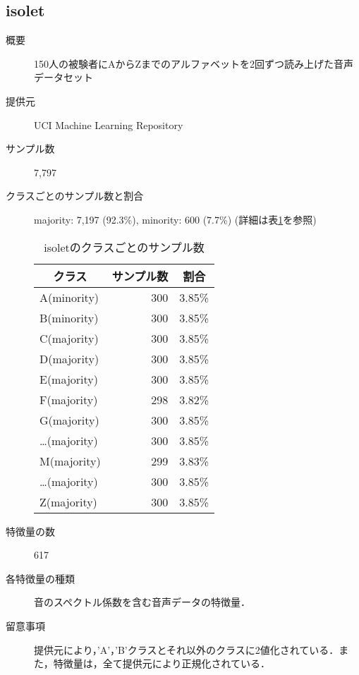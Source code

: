 \subsection{isolet}
\begin{description}
    \item[概要] 150人の被験者にAからZまでのアルファベットを2回ずつ読み上げた音声データセット\cite{isolet}
    \item[提供元] UCI Machine Learning Repository
    \item[サンプル数] 7,797
    \item[クラスごとのサンプル数と割合] majority: 7,197 (92.3\%), minority: 600 (7.7\%) (詳細は表\ref{tab:isolet}を参照)

        \begin{table}[htbp]
            \centering
            \caption{isoletのクラスごとのサンプル数}
            \label{tab:isolet}
            \begin{tabular}{lrc} \hline
                \multicolumn{1}{c}{クラス}&
                \multicolumn{1}{c}{サンプル数}&
                \multicolumn{1}{c}{割合}\\
                \hline
                \hline
                A(minority)&300&3.85\%\\
                B(minority)&300&3.85\%\\
                C(majority)&300&3.85\%\\
                D(majority)&300&3.85\%\\
                E(majority)&300&3.85\%\\
                F(majority)&298&3.82\%\\
                G(majority)&300&3.85\%\\
                \dots(majority)&300&3.85\%\\
                M(majority)&299&3.83\%\\
                \dots(majority)&300&3.85\%\\
                Z(majority)&300&3.85\%\\              
                \hline
            \end{tabular}
        \end{table}

    \item[特徴量の数] 617
    \item[各特徴量の種類] 音のスペクトル係数を含む音声データの特徴量．
        
    \item[留意事項] 提供元により，'A'，'B'クラスとそれ以外のクラスに2値化されている．また，特徴量は，全て提供元により正規化されている．
\end{description}

